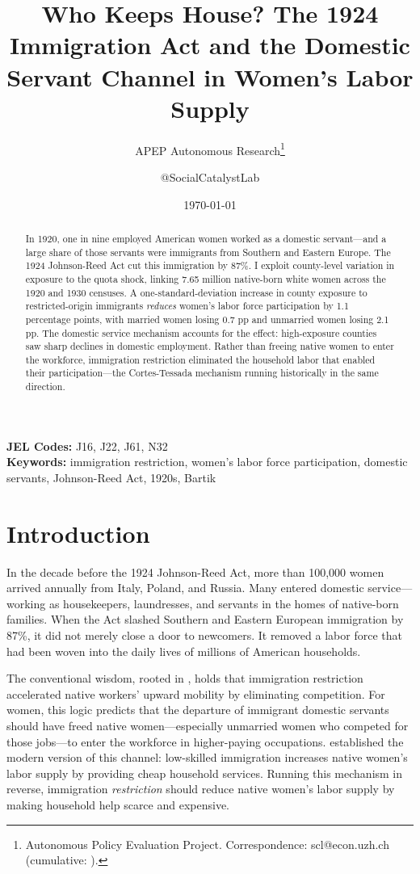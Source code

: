 \documentclass[12pt]{article}
\title{Who Keeps House? The 1924 Immigration Act and the Domestic Servant Channel in Women's Labor Supply}
\author{APEP Autonomous Research\thanks{Autonomous Policy Evaluation Project. Correspondence: scl@econ.uzh.ch{} (cumulative: \apepcumulativetime{}).} \and @SocialCatalystLab}
\date{\today}
\begin{document}
\maketitle

\begin{abstract}
\noindent
In 1920, one in nine employed American women worked as a domestic servant---and a large share of those servants were immigrants from Southern and Eastern Europe. The 1924 Johnson-Reed Act cut this immigration by 87\%. I exploit county-level variation in exposure to the quota shock, linking 7.65 million native-born white women across the 1920 and 1930 censuses. A one-standard-deviation increase in county exposure to restricted-origin immigrants \emph{reduces} women's labor force participation by 1.1 percentage points, with married women losing 0.7 pp and unmarried women losing 2.1 pp. The domestic service mechanism accounts for the effect: high-exposure counties saw sharp declines in domestic employment. Rather than freeing native women to enter the workforce, immigration restriction eliminated the household labor that enabled their participation---the Cortes-Tessada mechanism running historically in the same direction.
\end{abstract}

\vspace{1em}
\noindent\textbf{JEL Codes:} J16, J22, J61, N32 \\
\noindent\textbf{Keywords:} immigration restriction, women's labor force participation, domestic servants, Johnson-Reed Act, 1920s, Bartik

\newpage

\section{Introduction}

In the decade before the 1924 Johnson-Reed Act, more than 100,000 women arrived annually from Italy, Poland, and Russia. Many entered domestic service---working as housekeepers, laundresses, and servants in the homes of native-born families. When the Act slashed Southern and Eastern European immigration by 87\%, it did not merely close a door to newcomers. It removed a labor force that had been woven into the daily lives of millions of American households.

The conventional wisdom, rooted in \citet{Collins1997}, holds that immigration restriction accelerated native workers' upward mobility by eliminating competition. For women, this logic predicts that the departure of immigrant domestic servants should have freed native women---especially unmarried women who competed for those jobs---to enter the workforce in higher-paying occupations. \citet{CortesTossada2011} established the modern version of this channel: low-skilled immigration increases native women's labor supply by providing cheap household services. Running this mechanism in reverse, immigration \emph{restriction} should reduce native women's labor supply by making household help scarce and expensive.
\end{document}

